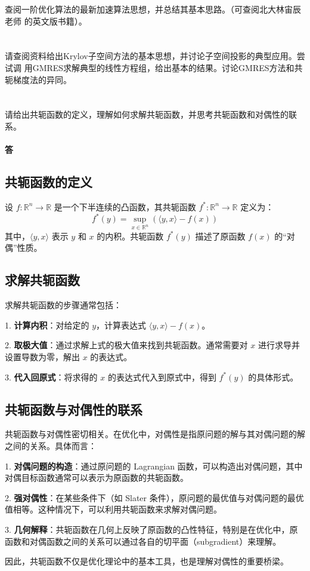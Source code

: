 \documentclass[a4paper]{article}
\begin{document}
查阅一阶优化算法的最新加速算法思想，并总结其基本思路。（可查阅北大林宙辰老师
的英文版书籍）。

\section{}

请查阅资料给出Krylov子空间方法的基本思想，并讨论子空间投影的典型应用。尝试调
用GMRES求解典型的线性方程组，给出基本的结果。讨论GMRES方法和共轭梯度法的异同。

\section{}

请给出共轭函数的定义，理解如何求解共轭函数，并思考共轭函数和对偶性的联系。

\paragraph{答}

\subsection{共轭函数的定义}

设 $f: \mathbb{R}^n \to \mathbb{R}$ 是一个下半连续的凸函数，其共轭函数 $f^*: \mathbb{R}^n \to \mathbb{R}$ 定义为：
\[
f^*(y) = \sup_{x \in \mathbb{R}^n} \left( \langle y, x \rangle - f(x) \right)
\]
其中，$\langle y, x \rangle$ 表示 $y$ 和 $x$ 的内积。共轭函数 $f^*(y)$ 描述了原函数 $f(x)$ 的“对偶”性质。

\subsection{求解共轭函数}

求解共轭函数的步骤通常包括：

1. \textbf{计算内积}：对给定的 $y$，计算表达式 $ \langle y, x \rangle - f(x) $。

2. \textbf{取极大值}：通过求解上式的极大值来找到共轭函数。通常需要对 $x$ 进行求导并设置导数为零，解出 $x$ 的表达式。

3. \textbf{代入回原式}：将求得的 $x$ 的表达式代入到原式中，得到 $f^*(y)$ 的具体形式。

\subsection{共轭函数与对偶性的联系}

共轭函数与对偶性密切相关。在优化中，对偶性是指原问题的解与其对偶问题的解之间的关系。具体而言：

1. \textbf{对偶问题的构造}：通过原问题的 Lagrangian 函数，可以构造出对偶问题，其中对偶目标函数通常可以表示为原函数的共轭函数。

2. \textbf{强对偶性}：在某些条件下（如 Slater 条件），原问题的最优值与对偶问题的最优值相等。这种情况下，可以利用共轭函数来求解对偶问题。

3. \textbf{几何解释}：共轭函数在几何上反映了原函数的凸性特征，特别是在优化中，原函数和对偶函数之间的关系可以通过各自的切平面（subgradient）来理解。

因此，共轭函数不仅是优化理论中的基本工具，也是理解对偶性的重要桥梁。
\end{document}
